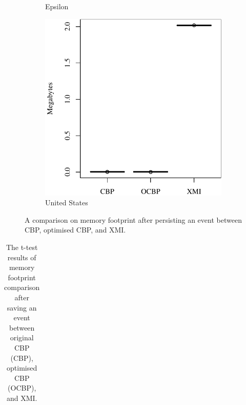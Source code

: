 \documentclass{llncs}
\begin{document}
{\begin{figure}
\begin{subfigure}{0.325\textwidth}
            \caption{Epsilon}
            \label{fig:save_memory_epsilon}
        \end{subfigure}
        \hfill
        \begin{subfigure}{0.325\textwidth}
            \centering
            \includegraphics[width=\linewidth]{images/save_memory_wikipedia}
            \caption{United States}
            \label{fig:save_memory_wikipedia}
        \end{subfigure}
        \caption{A comparison on memory footprint after persisting an event between CBP, optimised CBP, and XMI.}
        \label{fig:savememory}
    \end{figure}

   \begin{table}[t]
       \small
       \centering
       \caption{The t-test results of memory footprint comparison after saving an event between original CBP (CBP), optimised CBP (OCBP), and XMI.}
       \label{table:ttest_results_save_memory}
       \begin{tabular}
           {|p{}|p{}|p{}|p{}|p{}|p{}|p{}|}
           \hline 
           

\end{tabular}
\end{table}}
\end{document}

